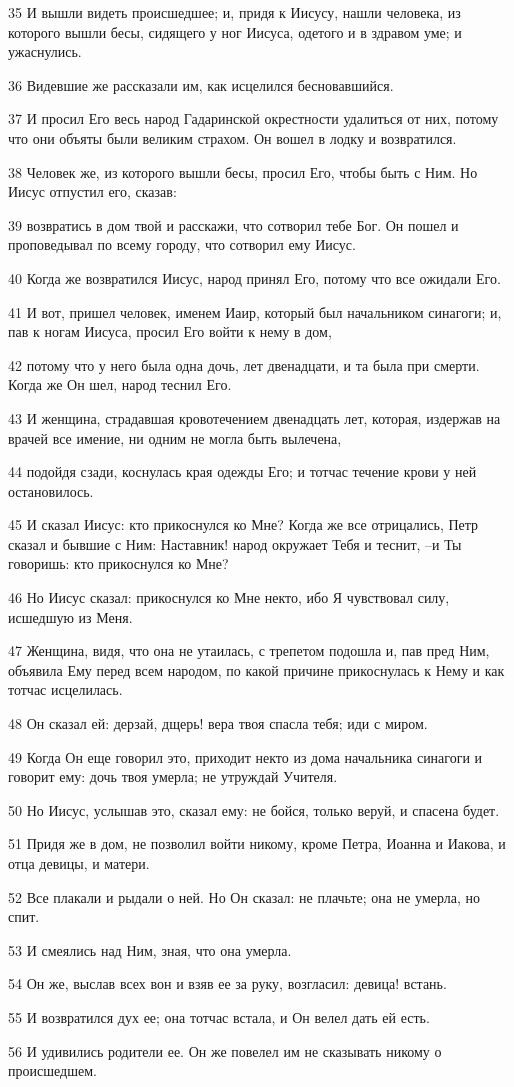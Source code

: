 \par 35 И вышли видеть происшедшее; и, придя к Иисусу, нашли человека, из которого вышли бесы, сидящего у ног Иисуса, одетого и в здравом уме; и ужаснулись.
\par 36 Видевшие же рассказали им, как исцелился бесновавшийся.
\par 37 И просил Его весь народ Гадаринской окрестности удалиться от них, потому что они объяты были великим страхом. Он вошел в лодку и возвратился.
\par 38 Человек же, из которого вышли бесы, просил Его, чтобы быть с Ним. Но Иисус отпустил его, сказав:
\par 39 возвратись в дом твой и расскажи, что сотворил тебе Бог. Он пошел и проповедывал по всему городу, что сотворил ему Иисус.
\par 40 Когда же возвратился Иисус, народ принял Его, потому что все ожидали Его.
\par 41 И вот, пришел человек, именем Иаир, который был начальником синагоги; и, пав к ногам Иисуса, просил Его войти к нему в дом,
\par 42 потому что у него была одна дочь, лет двенадцати, и та была при смерти. Когда же Он шел, народ теснил Его.
\par 43 И женщина, страдавшая кровотечением двенадцать лет, которая, издержав на врачей все имение, ни одним не могла быть вылечена,
\par 44 подойдя сзади, коснулась края одежды Его; и тотчас течение крови у ней остановилось.
\par 45 И сказал Иисус: кто прикоснулся ко Мне? Когда же все отрицались, Петр сказал и бывшие с Ним: Наставник! народ окружает Тебя и теснит, --и Ты говоришь: кто прикоснулся ко Мне?
\par 46 Но Иисус сказал: прикоснулся ко Мне некто, ибо Я чувствовал силу, исшедшую из Меня.
\par 47 Женщина, видя, что она не утаилась, с трепетом подошла и, пав пред Ним, объявила Ему перед всем народом, по какой причине прикоснулась к Нему и как тотчас исцелилась.
\par 48 Он сказал ей: дерзай, дщерь! вера твоя спасла тебя; иди с миром.
\par 49 Когда Он еще говорил это, приходит некто из дома начальника синагоги и говорит ему: дочь твоя умерла; не утруждай Учителя.
\par 50 Но Иисус, услышав это, сказал ему: не бойся, только веруй, и спасена будет.
\par 51 Придя же в дом, не позволил войти никому, кроме Петра, Иоанна и Иакова, и отца девицы, и матери.
\par 52 Все плакали и рыдали о ней. Но Он сказал: не плачьте; она не умерла, но спит.
\par 53 И смеялись над Ним, зная, что она умерла.
\par 54 Он же, выслав всех вон и взяв ее за руку, возгласил: девица! встань.
\par 55 И возвратился дух ее; она тотчас встала, и Он велел дать ей есть.
\par 56 И удивились родители ее. Он же повелел им не сказывать никому о происшедшем.

